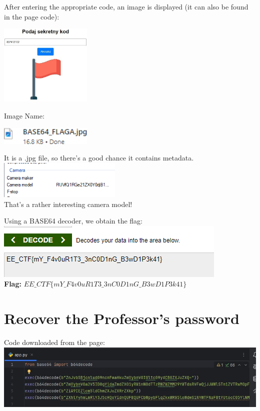 \documentclass{article}
\begin{document}
\newpage
After entering the appropriate code, an image is displayed (it can also be found in the page code):
\vspace{3mm}
\begin{multicols}{2}
    \begin{center}
        \includegraphics[width=0.33\textwidth]{"image3.jpeg"}
    \end{center}
    \columnbreak
    Image Name:
    \begin{center}
        \includegraphics[width=0.33\textwidth]{"image4.png"}
    \end{center}
    It is a .jpg file, so there’s a good chance it contains metadata. \\
    \includegraphics[width=0.44\textwidth]{"image5.png"} \\
    That's a rather interesting camera model!
\end{multicols}

Using a BASE64 decoder, we obtain the flag:
\vspace{3mm} \\
\includegraphics[width=\textwidth]{"image6.png"}
\vspace{3mm} \\
\textbf{Flag:} $ EE\_CTF\{mY\_F4v0uR1T3\_3nC0D1nG\_B3wD1P3k41\} $

\newpage
\section{Recover the Professor's password}
Code downloaded from the page:
\vspace{3mm} \\
\includegraphics[width=\textwidth]{"image7.jpeg"}
\end{document}
